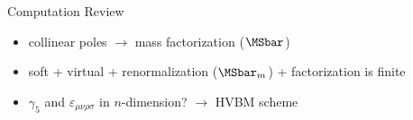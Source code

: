 \begin{frame}{Computation Review}
\begin{itemize}
 + %
 + \ldots
\item<3-> collinear poles $\to$ mass factorization ($\MSbar$)
\item<3-> soft + virtual + renormalization ($\MSbar_m$) + factorization is finite 
\item<4-> $\gamma_5$ and $\varepsilon_{\mu\nu\rho\sigma}$ in $n$-dimension? $\to$ HVBM scheme 
\end{itemize}
\end{frame}
